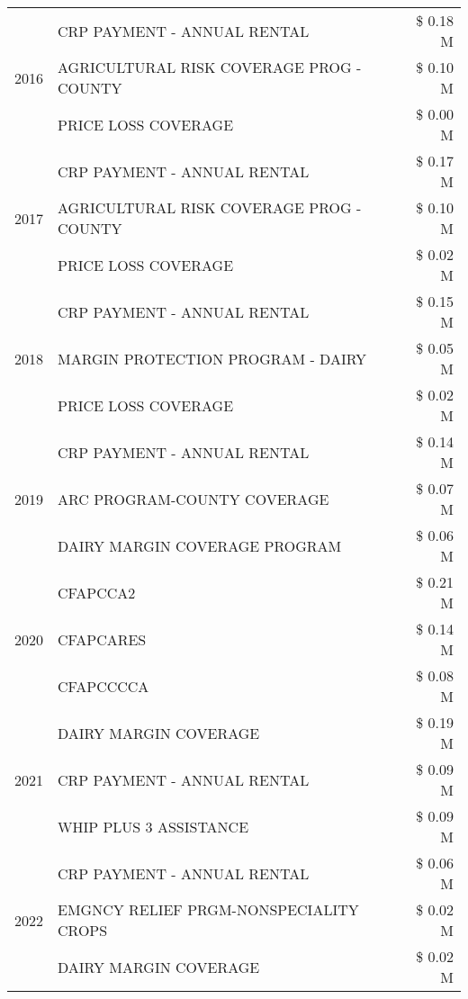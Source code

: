 \begin{tabular}{llr}
\cline{1-3}
\multirow[t]{3}{*}{2016} & CRP PAYMENT - ANNUAL RENTAL & \$ 0.18 M \\
 & AGRICULTURAL RISK COVERAGE PROG - COUNTY & \$ 0.10 M \\
 & PRICE LOSS COVERAGE & \$ 0.00 M \\
\cline{1-3}
\multirow[t]{3}{*}{2017} & CRP PAYMENT - ANNUAL RENTAL & \$ 0.17 M \\
 & AGRICULTURAL RISK COVERAGE PROG - COUNTY & \$ 0.10 M \\
 & PRICE LOSS COVERAGE & \$ 0.02 M \\
\cline{1-3}
\multirow[t]{3}{*}{2018} & CRP PAYMENT - ANNUAL RENTAL & \$ 0.15 M \\
 & MARGIN PROTECTION PROGRAM - DAIRY & \$ 0.05 M \\
 & PRICE LOSS COVERAGE & \$ 0.02 M \\
\cline{1-3}
\multirow[t]{3}{*}{2019} & CRP PAYMENT - ANNUAL RENTAL & \$ 0.14 M \\
 & ARC PROGRAM-COUNTY COVERAGE & \$ 0.07 M \\
 & DAIRY MARGIN COVERAGE PROGRAM & \$ 0.06 M \\
\cline{1-3}
\multirow[t]{3}{*}{2020} & CFAPCCA2 & \$ 0.21 M \\
 & CFAPCARES & \$ 0.14 M \\
 & CFAPCCCCA & \$ 0.08 M \\
\cline{1-3}
\multirow[t]{3}{*}{2021} & DAIRY MARGIN COVERAGE & \$ 0.19 M \\
 & CRP PAYMENT - ANNUAL RENTAL & \$ 0.09 M \\
 & WHIP PLUS 3 ASSISTANCE & \$ 0.09 M \\
\cline{1-3}
\multirow[t]{3}{*}{2022} & CRP PAYMENT - ANNUAL RENTAL & \$ 0.06 M \\
 & EMGNCY RELIEF PRGM-NONSPECIALITY CROPS & \$ 0.02 M \\
 & DAIRY MARGIN COVERAGE & \$ 0.02 M \\
\cline{1-3}
\bottomrule
\end{tabular}
